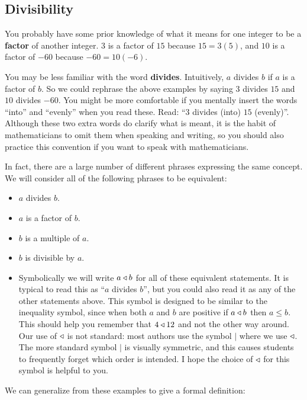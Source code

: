 \subsection{Divisibility}

You probably have some prior knowledge of what it means for one integer to be a \textbf{factor} of another integer.  $3$ is a factor of $15$ because $15 = 3(5)$, and $10$ is a factor of $-60$ because $-60 = 10(-6)$.  

You may be less familiar with the word \textbf{divides}.  Intuitively, $a$ divides $b$ if $a$ is a factor of $b$.  So we could rephrase the above examples by saying $3$ divides $15$ and $10$ divides $-60$.  You might be more comfortable if you mentally insert the words ``into'' and ``evenly'' when you read these.  Read:  ``$3$ divides (into) $15$ (evenly)''.  Although these two extra words do clarify what is meant, it is the habit of mathematicians to omit them when speaking and writing, so you should also practice this convention if you want to speak with mathematicians.

In fact, there are a large number of different phrases expressing the same concept.  We will consider all of the following phrases to be equivalent:

\begin{itemize}
	\item $a$ divides $b$.
	\item $a$ is a factor of $b$.
	\item $b$ is a multiple of $a$.
	\item $b$ is divisible by $a$.
	\item Symbolically we will write $a \triangleleft b$ for all of these equivalent statements.  It is typical to read this as ``$a$ divides $b$'', but you could also read it as any of the other statements above. This symbol is designed to be similar to the inequality symbol, since when both $a$ and $b$ are positive  if $a \triangleleft b$ then $a \leq b$.  This should help you remember that $4 \triangleleft 12$ and not the other way around.  Our use of $\triangleleft$ is not standard:  most authors use the symbol $|$ where we use $\triangleleft$.  The more standard symbol $|$ is visually symmetric, and this causes students to frequently forget which order is intended.  I hope the choice of $\triangleleft$ for this symbol is helpful to you.
\end{itemize}

We can generalize from these examples to give a formal definition:

\medskip

